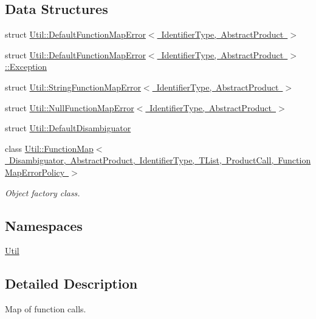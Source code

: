 \subsection*{Data Structures}
\begin{DoxyCompactItemize}
\item 
struct \mbox{\hyperlink{structUtil_1_1DefaultFunctionMapError}{Util\+::\+Default\+Function\+Map\+Error$<$ Identifier\+Type, Abstract\+Product $>$}}
\item 
struct \mbox{\hyperlink{structUtil_1_1DefaultFunctionMapError_1_1Exception}{Util\+::\+Default\+Function\+Map\+Error$<$ Identifier\+Type, Abstract\+Product $>$\+::\+Exception}}
\item 
struct \mbox{\hyperlink{structUtil_1_1StringFunctionMapError}{Util\+::\+String\+Function\+Map\+Error$<$ Identifier\+Type, Abstract\+Product $>$}}
\item 
struct \mbox{\hyperlink{structUtil_1_1NullFunctionMapError}{Util\+::\+Null\+Function\+Map\+Error$<$ Identifier\+Type, Abstract\+Product $>$}}
\item 
struct \mbox{\hyperlink{structUtil_1_1DefaultDisambiguator}{Util\+::\+Default\+Disambiguator}}
\item 
class \mbox{\hyperlink{classUtil_1_1FunctionMap}{Util\+::\+Function\+Map$<$ Disambiguator, Abstract\+Product, Identifier\+Type, T\+List, Product\+Call, Function\+Map\+Error\+Policy $>$}}
\begin{DoxyCompactList}\small\item\em Object factory class. \end{DoxyCompactList}\end{DoxyCompactItemize}
\subsection*{Namespaces}
\begin{DoxyCompactItemize}
\item 
 \mbox{\hyperlink{namespaceUtil}{Util}}
\end{DoxyCompactItemize}


\subsection{Detailed Description}
Map of function calls. 

